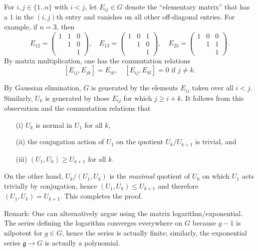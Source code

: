 \documentclass[reqno]{amsart} 
\begin{document}
\begin{itemize}
  For $i, j \in \{1..n\}$ with $i < j$,
  let $E_{i j} \in G$
  denote the ``elementary matrix'' that has a $1$ in the $(i,j)$th entry
  and vanishes
  on all other off-diagonal entries.
  For example, if $n = 3$,
  then
  \begin{equation*}
  E_{12}
  = 
\begin{pmatrix}
    1 & 1 & 0 \\
    & 1 & 0 \\
    &  & 1
  \end{pmatrix}
,
  \quad 
  E_{13}
  = 
\begin{pmatrix}
    1 & 0  & 1 \\
    & 1 & 0 \\
    &  & 1
  \end{pmatrix}
,
  \quad 
  E_{23}
  = 
\begin{pmatrix}
    1 & 0  & 0 \\
    & 1 & 1 \\
    &  & 1
  \end{pmatrix}
.
  \end{equation*}
  By matrix multiplication, one has the commutation relations
  \begin{equation*}
    {}  [E_{i j}, E_{j k}] = E_{i k},
    \quad
    {}[E_{ij},E_{k l}] = 0 \text{ if } j \neq k.
  \end{equation*}

  By Gaussian elimination, $G$ is generated by the elements
  $E_{i j}$ taken over all $i < j$.  Similarly, $U_k$ is
  generated by those $E_{i j}$ for which $j \geq i + k$.  It
  follows from this observation and the commutation relations
  that
  \begin{enumerate}
  \item[(i)]
    $U_k$ is normal in $U_1$ for all $k$,
  \item[(ii)]
    the conjugation action of $U_1$ on the quotient $U_k / U_{k+1}$ is
    trivial,
    and
  \item [(iii)]
    $(U_1,U_k) \geq U_{k+1}$ for all $k$.
  \end{enumerate}
  On the other hand,
  $U_k / (U_1,U_k)$ is the \emph{maximal} quotient of $U_k$ on
  which $U_1$ acts trivially by conjugation,
  hence
  $(U_1,U_k) \leq U_{k+1}$
  and
  therefore $(U_1,U_k) = U_{k+1}$.
  This completes the proof.

  Remark:
  One can alternatively argue using the matrix
  logarithm/exponential.
  The series defining the logarithm converges
  everywhere on $G$ because $g-1$ is nilpotent for $g \in G$,
  hence the series is actually finite;
  similarly, the exponential series
  $\mathfrak{g} \rightarrow G$ is actually a polynomial.


\end{itemize}
\end{document}
